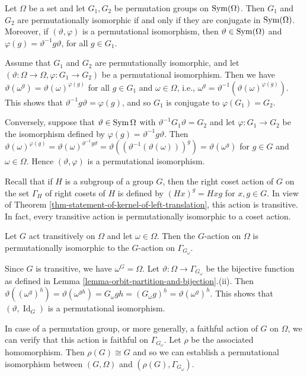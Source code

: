 



\begin{proposition} \label{prop-isom-perm-grp-are-conj}
	Let $\Omega$ be a set and let $G_1,G_2$ be permutation groups on $\operatorname{Sym}(\Omega)$. Then $G_1$ and $G_2$ are permutationally isomorphic if and only if they are conjugate in $\operatorname{Sym}(\Omega)$. Moreover, if $(\vartheta, \varphi)$ is a permutational isomorphism, then $\vartheta \in \operatorname{Sym}(\Omega)$ and $\varphi(g) = \vartheta^{-1}g\vartheta$, for all $g \in G_1$.
\end{proposition}

\begin{sketch}
	Assume that $G_1$ and $G_2$ are permutationally isomorphic, and let $(\vartheta:\Omega\to \Omega, \varphi:G_1\rightarrow G_2)$ be a permutational isomorphism. Then we have $\vartheta(\omega^g) = \vartheta(\omega)^{\varphi(g)}$ for all $g \in G_1$ and $\omega \in \Omega$, i.e., $\omega^g = \vartheta^{-1}(\vartheta(\omega)^{\varphi(g)})$. This shows that $\vartheta^{-1}g\vartheta = \varphi(g)$, and so $G_1$ is conjugate to $\varphi(G_1) = G_2$.
	
	Conversely, suppose that $\vartheta \in \operatorname{Sym}\Omega$ with $\vartheta^{-1}G_1\vartheta = G_2$ and let $\varphi: G_1 \to G_2$ be the isomorphism defined by  $\varphi(g) = \vartheta^{-1}g\vartheta$. Then  $\vartheta(\omega)^{\varphi(g)} = \vartheta(\omega)^{\vartheta^{-1}g\vartheta} = \vartheta((\vartheta^{-1}(\vartheta(\omega)))^{g}) = \vartheta(\omega^g)$ for $g \in G$ and $\omega \in \Omega$. Hence $(\vartheta, \varphi)$ is a permutational isomorphism.
\end{sketch}

 Recall that if $H$ is a subgroup of  a group $G$, then the right coset action of $G$ on the set $\Gamma_H$ of right cosets of $H$  is defined by $(Hx)^g  = Hxg$ for $x,g\in G$. In view of Theorem \ref{thm-statement-of-kernel-of-left-translation}, this action is transitive. In fact, every transitive action is permutationally isomorphic to a coset action. 
\begin{proposition} \label{prop-transitive-action-perm-isom}
	Let $G$ act transitively on $\Omega$ and let $\omega\in \Omega$. Then the $G$-action on $\Omega$ is permutationally isomorphic to the $G$-action on $\Gamma_{G_\omega}$.
\end{proposition}
\begin{sketch}
	Since $G$ is transitive, we have $\omega^G = \Omega$. Let $\vartheta:\Omega \rightarrow \Gamma_{G_\omega}$ be the bijective function as defined in Lemma \ref{lemma-orbit-partition-and-bijection}.(ii). Then $\vartheta((\omega^g)^h) = \vartheta(\omega^{gh}) = G_\omega gh = (G_\omega g)^h = \vartheta(\omega^g)^h$. This shows that $(\vartheta,\operatorname{Id}_G)$ is a permutational isomorphism.
\end{sketch}
\begin{remark}
	In case of a permutation group, or more generally, a faithful action of $G$ on $\Omega$, we can verify that this action is faithful on $\Gamma_{G_\omega}$. Let $\rho$ be the associated homomorphism. Then $\rho(G)\cong G$ and so we can establish a permutational isomorphism between $(G,\Omega)$ and $(\rho(G),\Gamma_{G_\omega})$.
\end{remark}


